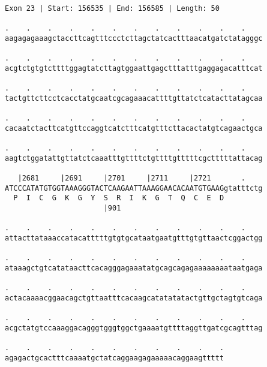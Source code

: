 \documentclass{article}
\begin{document}
\begin{Verbatim}
Exon 23 | Start: 156535 | End: 156585 | Length: 50
 
.    .    .    .    .    .    .    .    .    .    .    .    
aagagagaaagctaccttcagtttccctcttagctatcactttaacatgatctatagggc
  
.    .    .    .    .    .    .    .    .    .    .    .    
acgtctgtgtcttttggagtatcttagtggaattgagctttatttgaggagacatttcat
  
.    .    .    .    .    .    .    .    .    .    .    .    
tactgttcttcctcacctatgcaatcgcagaaacattttgttatctcatacttatagcaa
  
.    .    .    .    .    .    .    .    .    .    .    .    
cacaatctacttcatgttccaggtcatctttcatgtttcttacactatgtcagaactgca
  
.    .    .    .    .    .    .    .    .    .    .    .    
aagtctggatattgttatctcaaatttgttttctgttttgtttttcgctttttattacag
  
   |2681     |2691     |2701     |2711     |2721       .    
ATCCCATATGTGGTAAAGGGTACTCAAGAATTAAAGGAACACAATGTGAAGgtatttctg
  P  I  C  G  K  G  Y  S  R  I  K  G  T  Q  C  E  D         
                       |901                                 
  
.    .    .    .    .    .    .    .    .    .    .    .    
attacttataaaccatacatttttgtgtgcataatgaatgtttgtgttaactcggactgg
  
.    .    .    .    .    .    .    .    .    .    .    .    
ataaagctgtcatataacttcacagggagaaatatgcagcagagaaaaaaaataatgaga
  
.    .    .    .    .    .    .    .    .    .    .    .    
actacaaaacggaacagctgttaatttcacaagcatatatatactgttgctagtgtcaga
  
.    .    .    .    .    .    .    .    .    .    .    .    
acgctatgtccaaaggacagggtgggtggctgaaaatgttttaggttgatcgcagtttag
  
.    .    .    .    .    .    .    .    .    .    .
agagactgcactttcaaaatgctatcaggaagagaaaaacaggaagttttt
\end{Verbatim}
\newpage
\end{document}
